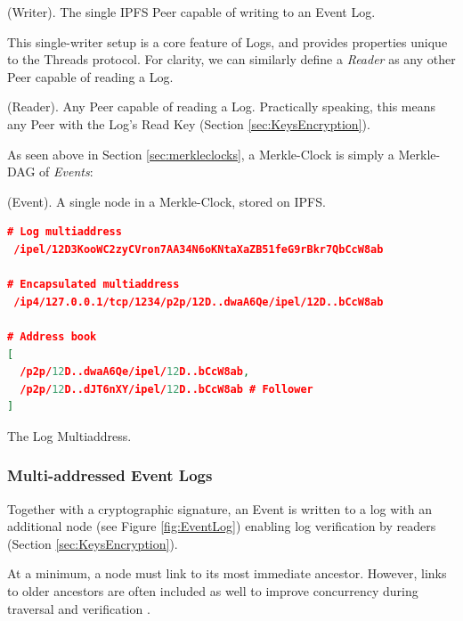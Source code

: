 \documentclass{textile}
\begin{document}
\begin{definition}
(Writer). The single IPFS Peer capable of writing to an Event Log.
\end{definition}

This single-writer setup is a core feature of Logs, and provides properties unique to the Threads protocol. For clarity, we can similarly define a \emph{Reader} as any other Peer capable of reading a Log.

\begin{definition}
(Reader). Any Peer capable of reading a Log. Practically speaking, this means any Peer with the Log's Read Key (Section  \ref{sec:KeysEncryption}).
\end{definition}

As seen above in Section \ref{sec:merkleclocks}, a Merkle-Clock is simply a Merkle-DAG of \emph{Events}:

\begin{definition}
 (Event). A single node in a Merkle-Clock, stored on IPFS.
\end{definition}

\FloatBarrier

\begin{example*}[!b]
\centering
\begin{minipage}{0.7\textwidth}
\begin{lstlisting}[language=json,firstnumber=1]
# Log multiaddress
 /ipel/12D3KooWC2zyCVron7AA34N6oKNtaXaZB51feG9rBkr7QbCcW8ab

# Encapsulated multiaddress
 /ip4/127.0.0.1/tcp/1234/p2p/12D..dwaA6Qe/ipel/12D..bCcW8ab

# Address book
[
  /p2p/12D..dwaA6Qe/ipel/12D..bCcW8ab,
  /p2p/12D..dJT6nXY/ipel/12D..bCcW8ab # Follower
]
\end{lstlisting}
\end{minipage}
  \caption{The Log Multiaddress.}
  \label{ex:Multiaddress}
\end{example*}

\subsubsection{Multi-addressed Event Logs}

Together with a cryptographic signature, an Event is written to a log with an additional node (see Figure \ref{fig:EventLog}) enabling log verification by readers (Section \ref{sec:KeysEncryption}).

At a minimum, a node must link to its most immediate ancestor. However, links to older ancestors are often included as well to improve concurrency during traversal and verification \cite{meyerBamboo2019}.
\end{document}
